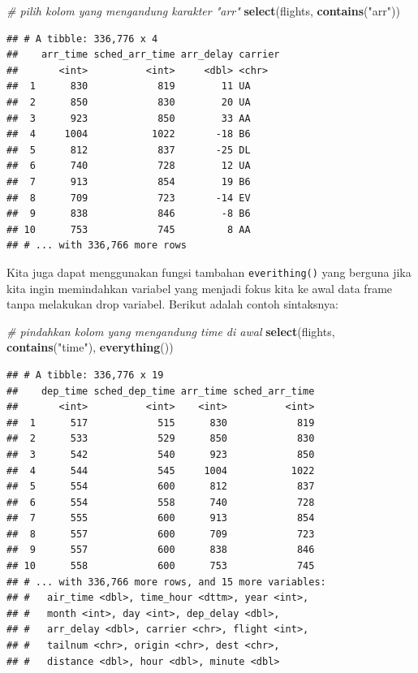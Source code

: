 \documentclass[]{book}
\newenvironment{Shaded}{\begin{snugshade}}{\end{snugshade}}
\newcommand{\KeywordTok}[1]{\textcolor[rgb]{0.13,0.29,0.53}{\textbf{#1}}}
\newcommand{\StringTok}[1]{\textcolor[rgb]{0.31,0.60,0.02}{#1}}
\newcommand{\CommentTok}[1]{\textcolor[rgb]{0.56,0.35,0.01}{\textit{#1}}}
\newcommand{\NormalTok}[1]{#1}
\begin{document}
\begin{Shaded}
\begin{Highlighting}[]
\CommentTok{# pilih kolom yang mengandung karakter "arr"}
\KeywordTok{select}\NormalTok{(flights, }\KeywordTok{contains}\NormalTok{(}\StringTok{"arr"}\NormalTok{))}
\end{Highlighting}
\end{Shaded}

\begin{verbatim}
## # A tibble: 336,776 x 4
##    arr_time sched_arr_time arr_delay carrier
##       <int>          <int>     <dbl> <chr>  
##  1      830            819        11 UA     
##  2      850            830        20 UA     
##  3      923            850        33 AA     
##  4     1004           1022       -18 B6     
##  5      812            837       -25 DL     
##  6      740            728        12 UA     
##  7      913            854        19 B6     
##  8      709            723       -14 EV     
##  9      838            846        -8 B6     
## 10      753            745         8 AA     
## # ... with 336,766 more rows
\end{verbatim}

Kita juga dapat menggunakan fungsi tambahan \texttt{everithing()} yang
berguna jika kita ingin memindahkan variabel yang menjadi fokus kita ke
awal data frame tanpa melakukan drop variabel. Berikut adalah contoh
sintaksnya:

\begin{Shaded}
\begin{Highlighting}[]
\CommentTok{# pindahkan kolom yang mengandung time di awal}
\KeywordTok{select}\NormalTok{(flights, }\KeywordTok{contains}\NormalTok{(}\StringTok{"time"}\NormalTok{), }\KeywordTok{everything}\NormalTok{())}
\end{Highlighting}
\end{Shaded}

\begin{verbatim}
## # A tibble: 336,776 x 19
##    dep_time sched_dep_time arr_time sched_arr_time
##       <int>          <int>    <int>          <int>
##  1      517            515      830            819
##  2      533            529      850            830
##  3      542            540      923            850
##  4      544            545     1004           1022
##  5      554            600      812            837
##  6      554            558      740            728
##  7      555            600      913            854
##  8      557            600      709            723
##  9      557            600      838            846
## 10      558            600      753            745
## # ... with 336,766 more rows, and 15 more variables:
## #   air_time <dbl>, time_hour <dttm>, year <int>,
## #   month <int>, day <int>, dep_delay <dbl>,
## #   arr_delay <dbl>, carrier <chr>, flight <int>,
## #   tailnum <chr>, origin <chr>, dest <chr>,
## #   distance <dbl>, hour <dbl>, minute <dbl>
\end{verbatim}
\end{document}
